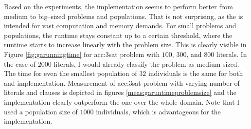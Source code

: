 Based on the experiments, the \cuda implementation seems to perform better from medium to big--sized problems and populations. That is not surprising, as the \gpu is intended for vast computation and memory demands. For small problems and populations, the runtime stays constant up to a certain threshold, where the runtime starts to increase linearly with the problem size. This is clearly visible in Figure \ref{fig:garunningtime} for \acrshort{acc:3sat} problem with $100$, $300$, and $800$ literals. In the case of $2000$ literals, I would already classify the problem as medium-sized. The time for even the smallest population of $32$ individuals is the same for both \cpu and \gpu implementation. Measurement of \acrshort{acc:3sat} problem with varying number of literals and clauses is depicted in figures \ref{meas:garuntimeproblemsize} and the \gpu implementation clearly outperform the \cpu one over the whole domain. Note that I used a population size of $1000$ individuals, which is advantageous for the \gpu implementation.

